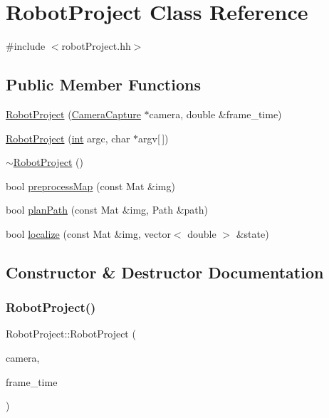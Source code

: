 \hypertarget{class_robot_project}{}\section{Robot\+Project Class Reference}
\label{class_robot_project}


{\ttfamily \#include $<$robot\+Project.\+hh$>$}

\subsection*{Public Member Functions}
\begin{DoxyCompactItemize}
\item 
\mbox{\hyperlink{class_robot_project_a3afaaa8731fb02fabaf2c47bb7c81799}{Robot\+Project}} (\mbox{\hyperlink{class_camera_capture}{Camera\+Capture}} $\ast$camera, double \&frame\+\_\+time)
\item 
\mbox{\hyperlink{class_robot_project_a12f627710a775cdec8a6416eeaf8db3e}{Robot\+Project}} (\mbox{\hyperlink{draw_8hh_aa620a13339ac3a1177c86edc549fda9b}{int}} argc, char $\ast$argv\mbox{[}$\,$\mbox{]})
\item 
\mbox{\hyperlink{class_robot_project_a8510ebe175da3b90ffea7c88b690b4f8}{$\sim$\+Robot\+Project}} ()
\item 
bool \mbox{\hyperlink{class_robot_project_a380adb448f0fcbc625df9401de3bb013}{preprocess\+Map}} (const Mat \&img)
\item 
bool \mbox{\hyperlink{class_robot_project_ad9077931a89d2226e6675c6107adfc53}{plan\+Path}} (const Mat \&img, Path \&path)
\item 
bool \mbox{\hyperlink{class_robot_project_a9899c66898ccd1b638fe074797a18398}{localize}} (const Mat \&img, vector$<$ double $>$ \&state)
\end{DoxyCompactItemize}


\subsection{Constructor \& Destructor Documentation}
\mbox{\label{class_robot_project_a3afaaa8731fb02fabaf2c47bb7c81799}} 
\subsubsection{\texorpdfstring{RobotProject()}{RobotProject()}\hspace{0.1cm}{\footnotesize\ttfamily [1/2]}}
{\footnotesize\ttfamily Robot\+Project\+::\+Robot\+Project (\begin{DoxyParamCaption}\item[{\mbox{\hyperlink{class_camera_capture}{Camera\+Capture}} $\ast$}]{camera,  }\item[{double \&}]{frame\+\_\+time }\end{DoxyParamCaption})}

